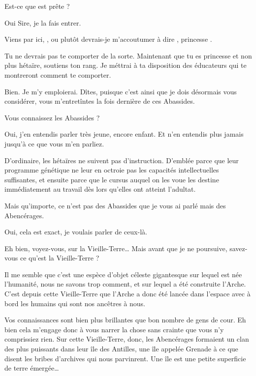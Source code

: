 \begin{drama}

  \elenaspeaks Est-ce que \ela est prête ?

  \alexasspeaks Oui Sire, je la fais entrer.

  \intrat{\ela}
  \exit{\alexas{}}

  \elenaspeaks Viens par ici, \ela, ou plutôt devrais-je m’accoutumer à dire \princesse, princesse \princesse.



  Tu ne devrais pas te comporter de la sorte. Maintenant que tu es princesse et non plus hétaïre, soutiens ton rang. Je méttrai à ta disposition des éducateurs qui te montreront comment te comporter.

  \elaspeaks Bien. Je m’y emploierai. Dîtes,  puisque c’est ainsi que je dois désormais vous considérer, vous m’entretîntes la fois dernière de ces Abassides.

  \elenaspeaks {} Vous connaissez les Abassides ?

  \elaspeaks Oui, j’en entendis parler très jeune, encore enfant. Et n’en entendis plus jamais jusqu’à ce que vous m’en parliez.

  \elenaspeaks D’ordinaire, les hétaïres ne suivent pas d’instruction. D’emblée parce que leur programme génétique ne leur en octroie pas les capacités intellectuelles suffisantes, et ensuite parce que le cursus auquel on les voue les destine immédiatement au travail dès lors qu’elles ont atteint l’adultat.

  Mais qu’importe, ce n’est pas des Abassides que je vous ai parlé mais des Abencérages.

  \elaspeaks Oui, cela est exact, je voulais parler de ceux-là.


  \elenaspeaks Eh bien, voyez-vous, sur la Vieille-Terre… Mais avant que je ne poursuive, savez-vous ce qu’est la Vieille-Terre ?

  \elaspeaks Il me semble que c’est une espèce d’objet céleste gigantesque sur lequel est née l’humanité, nous ne savons trop comment, et sur lequel a été construite l’Arche. C’est depuis cette Vieille-Terre que l’Arche a donc été lancée dans l’espace avec à bord les humains qui sont nos ancêtres à nous.

  \elenaspeaks Vos connaissances sont bien plus brillantes que bon nombre de gens de cour. Eh bien cela m’engage donc à vous narrer la chose sans crainte que vous n’y comprissiez rien.
  Sur cette Vieille-Terre, donc, les Abencérages formaient un clan des plus puissants dans leur île des Antilles, une île appelée Grenade à ce que disent les bribes d’archives qui nous parvinrent. Une île est une petite superficie de terre émergée…


\end{drama}
